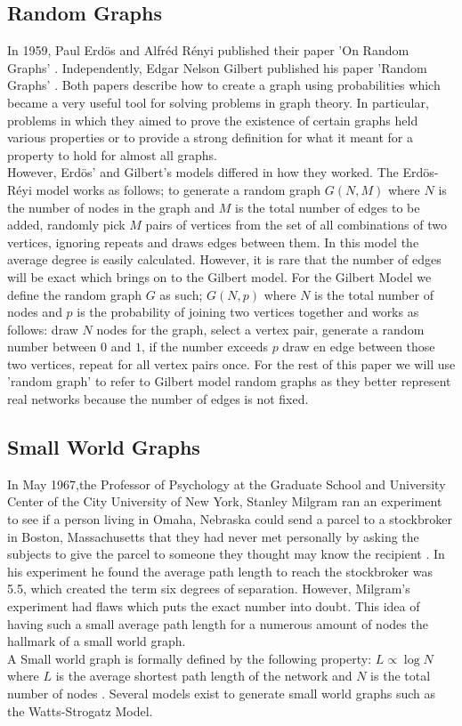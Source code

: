 \documentclass{article}
\begin{document}
        \subsection{Random Graphs}
        In 1959, Paul Erd\"{o}s and Alfr\'{e}d R\'{e}nyi published their paper 'On Random Graphs' \parencite{erd6s1959random}. Independently, Edgar Nelson Gilbert published his paper 'Random Graphs' \parencite{gilbert1959random}. Both papers describe how to create a graph using probabilities which became a very useful tool for solving problems in graph theory. In particular, problems in which they aimed to prove the existence of certain graphs held various properties or to provide a strong definition for what it meant for a property to hold for almost all graphs.\\ 
        However, Erd\"{o}s' and Gilbert's models differed in how they worked. The Erd\"{o}s-R\'{e}yi model works as follows; to generate a random graph $G(N,M)$ where $N$ is the number of nodes in the graph and $M$ is the total number of edges to be added, randomly pick $M$ pairs of vertices from the set of all combinations of two vertices, ignoring repeats and draws edges between them. In this model the average degree is easily calculated. However, it is rare that the number of edges will be exact which brings on to the Gilbert model. For the Gilbert Model we define the random graph $G$ as such; $G(N,p)$ where $N$ is the total number of nodes and $p$ is the probability of joining two vertices together and works as follows: draw $N$ nodes for the graph, select a vertex pair, generate a random number between $0$ and $1$, if the number exceeds $p$ draw en edge between those two vertices, repeat for all vertex pairs once. For the rest of this paper we will use 'random graph' to refer to Gilbert model random graphs as they better represent real networks because the number of edges is not fixed. 
        \subsection{Small World Graphs}
        In May 1967,the Professor of Psychology at the Graduate School and University Center of the City University of New York, Stanley Milgram ran an experiment to see if a person living
        in Omaha, Nebraska could send a parcel to a stockbroker in Boston, Massachusetts that they had never met personally by asking the subjects to give the parcel to someone they thought may know the recipient \parencite{milgram1967small}. In his experiment he found the average path length to reach the stockbroker was 5.5, which created the term
        six degrees of separation. However, Milgram's experiment had flaws which puts the exact number into doubt. This idea of having such a small average path length for a numerous amount of nodes the hallmark of a small world graph.\\
        A Small world graph is formally defined by the following property: $L\propto\log{N}$ where $L$ is the average shortest path length of the network and $N$ is the total number of nodes \parencite{Watts1998}. Several models exist to generate small world graphs such as the Watts-Strogatz Model.
\end{document}
